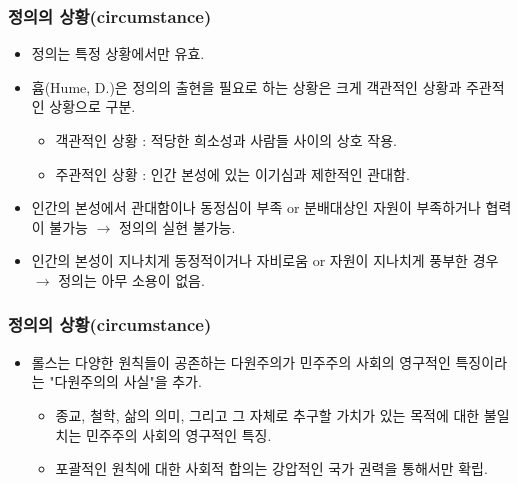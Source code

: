 \documentclass[aspectratio=169,xcolor=dvipsnames,handout]{beamer}
\begin{document}
\begin{frame}[<+->]
\frametitle{정의의 상황(circumstance)}
    \begin{itemize}
        \item 정의는 특정 상황에서만 유효. 
        \item 흄(Hume, D.)은 정의의 출현을 필요로 하는 상황은 크게 객관적인 상황과 주관적인 상황으로 구분.
        \begin{itemize}
            \item 객관적인 상황 : 적당한 희소성과 사람들 사이의 상호 작용. 
            \item 주관적인 상황 : 인간 본성에 있는 이기심과 제한적인 관대함.
        \end{itemize}
        \item 인간의 본성에서 관대함이나 동정심이 부족 or 분배대상인 자원이 부족하거나 협력이 불가능 $\rightarrow$ 정의의 실현 불가능.
        \item 인간의 본성이 지나치게 동정적이거나 자비로움 or 자원이 지나치게 풍부한 경우 $\rightarrow$ 정의는 아무 소용이 없음.
    \end{itemize}
\end{frame}



\begin{frame}[<+->]
\frametitle{정의의 상황(circumstance)}
    \begin{itemize}
        \item  롤스는 다양한 원칙들이 공존하는 다원주의가 민주주의 사회의 영구적인 특징이라는 "다원주의의 사실"을 추가.
        \begin{itemize}
            \item 종교, 철학, 삶의 의미, 그리고 그 자체로 추구할 가치가 있는 목적에 대한 불일치는 민주주의 사회의 영구적인 특징.
            \item 포괄적인 원칙에 대한 사회적 합의는 강압적인 국가 권력을 통해서만 확립.
        \end{itemize}
    \end{itemize}
\end{frame}
\end{document}
